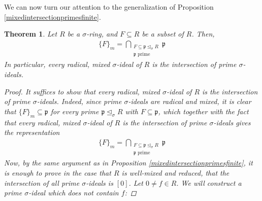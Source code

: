 \documentclass{article}
\def\p{\mathfrak{p}}
\def\s{\sigma}
\def\si{\unlhd_{\sigma}}
\newenvironment{bew}{\begin{proof}[Proof]}{\end{proof}}
\theoremstyle{plain}
\newtheorem{theorem}[Satz]{Theorem}
\theoremstyle{definition}
\begin{document}
We can now turn our attention to the generalization of Proposition \ref{mixedintersectionprimesfinite}. 


\begin{theorem}\label{intersectionprimes}
Let $R$ be a $\s$-ring, and $F \subseteq R$ be a subset of $R$. Then, 
\begin{align*} \{F\}_m = \bigcap_{\substack{F \subseteq \p \si R \\ \p \text{ prime}}} \p \end{align*}
In particular, every radical, mixed $\s$-ideal of $R$ is the intersection of prime $\s$-ideals.
\begin{bew}
It suffices to show that every radical, mixed $\s$-ideal of $R$ is the intersection of prime $\s$-ideals.
Indeed, since prime $\s$-ideals are radical and mixed, it is clear that $\{F\}_m \subseteq \p$ for every prime $\p \si R$ with $F \subseteq \p$, which together with the fact that every radical, mixed $\s$-ideal of $R$ is the intersection of prime $\s$-ideals gives the representation 
\begin{align*} \{F\}_m = \bigcap_{\substack{F \subseteq \p \si R \\ \p \text{ prime}}} \p \end{align*}
Now, by the same argument as in Proposition \ref{mixedintersectionprimesfinite}, it is enough to prove in the case that $R$ is well-mixed and reduced, that the intersection of all prime $\s$-ideals is $[0]$.
Let $0 \neq f \in R$. We will construct a prime $\s$-ideal which does not contain $f$: 


\end{bew}
\end{theorem}
\end{document}

